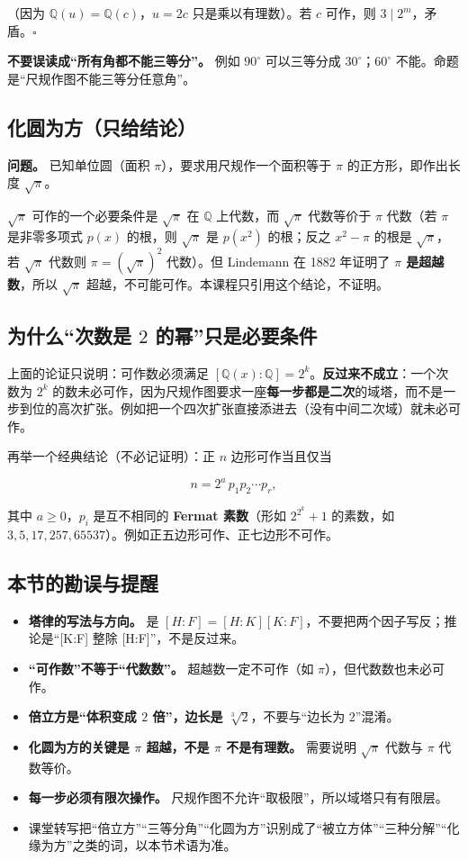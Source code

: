 （因为 $\mathbb Q(u)=\mathbb Q(c)$，$u=2c$ 只是乘以有理数）。若 $c$ 可作，则 $3\mid 2^m$，矛盾。$\square$

\textbf{不要误读成“所有角都不能三等分”。} 例如 $90^\circ$ 可以三等分成 $30^\circ$；$60^\circ$ 不能。命题是“尺规作图不能三等分任意角”。

\subsection{化圆为方（只给结论）}


\textbf{问题。} 已知单位圆（面积 $\pi$），要求用尺规作一个面积等于 $\pi$ 的正方形，即作出长度 $\sqrt{\pi}$。

$\sqrt{\pi}$ 可作的一个必要条件是 $\sqrt{\pi}$ 在 $\mathbb Q$ 上代数，而 $\sqrt{\pi}$ 代数等价于 $\pi$ 代数（若 $\pi$ 是非零多项式 $p(x)$ 的根，则 $\sqrt\pi$ 是 $p(x^2)$ 的根；反之 $x^2-\pi$ 的根是 $\sqrt\pi$，若 $\sqrt\pi$ 代数则 $\pi=(\sqrt\pi)^2$ 代数）。但 Lindemann 在 1882 年证明了 \textbf{$\pi$ 是超越数}，所以 $\sqrt\pi$ 超越，不可能可作。本课程只引用这个结论，不证明。

\subsection{为什么“次数是 $2$ 的幂”只是必要条件}


上面的论证只说明：可作数必须满足 $[\mathbb Q(x):\mathbb Q]=2^k$。\textbf{反过来不成立}：一个次数为 $2^k$ 的数未必可作，因为尺规作图要求一座\textbf{每一步都是二次}的域塔，而不是一步到位的高次扩张。例如把一个四次扩张直接添进去（没有中间二次域）就未必可作。

再举一个经典结论（不必记证明）：正 $n$ 边形可作当且仅当

\[
n=2^a\,p_1p_2\cdots p_r,
\]

其中 $a\ge0$，$p_i$ 是互不相同的 \textbf{Fermat 素数}（形如 $2^{2^k}+1$ 的素数，如 $3,5,17,257,65537$）。例如正五边形可作、正七边形不可作。

\subsection{本节的勘误与提醒}


\begin{itemize}
\item \textbf{塔律的写法与方向。} 是 $[H:F]=[H:K][K:F]$，不要把两个因子写反；推论是“[K:F] 整除 [H:F]”，不是反过来。
\item \textbf{“可作数”不等于“代数数”。} 超越数一定不可作（如 $\pi$），但代数数也未必可作。
\item \textbf{倍立方是“体积变成 $2$ 倍”，边长是 $\sqrt[3]{2}$}，不要与“边长为 $2$”混淆。
\item \textbf{化圆为方的关键是 $\pi$ 超越，不是 $\pi$ 不是有理数。} 需要说明 $\sqrt\pi$ 代数与 $\pi$ 代数等价。
\item \textbf{每一步必须有限次操作。} 尺规作图不允许“取极限”，所以域塔只有有限层。
\item 课堂转写把“倍立方”“三等分角”“化圆为方”识别成了“被立方体”“三种分解”“化缘为方”之类的词，以本节术语为准。
\end{itemize}
